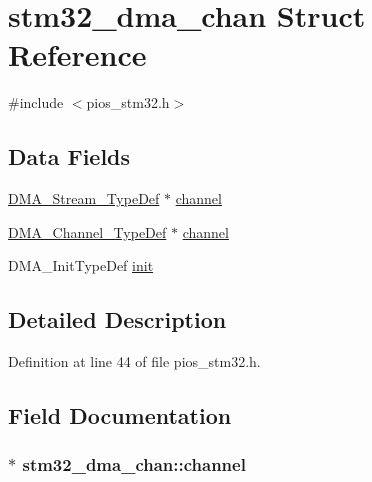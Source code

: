 \hypertarget{structstm32__dma__chan}{\section{stm32\-\_\-dma\-\_\-chan Struct Reference}
\label{structstm32__dma__chan}
}


{\ttfamily \#include $<$pios\-\_\-stm32.\-h$>$}

\subsection*{Data Fields}
\begin{DoxyCompactItemize}
\item 
\hyperlink{struct_d_m_a___stream___type_def}{D\-M\-A\-\_\-\-Stream\-\_\-\-Type\-Def} $\ast$ \hyperlink{structstm32__dma__chan_a17a0b808033d1fd3cdb23c379b2e8318}{channel}
\item 
\hyperlink{struct_d_m_a___channel___type_def}{D\-M\-A\-\_\-\-Channel\-\_\-\-Type\-Def} $\ast$ \hyperlink{structstm32__dma__chan_a83c74feec82b3ebc787cab90df6b2264}{channel}
\item 
D\-M\-A\-\_\-\-Init\-Type\-Def \hyperlink{structstm32__dma__chan_a26b43c1f3ac4595c61a12d5bf54c39fb}{init}
\end{DoxyCompactItemize}


\subsection{Detailed Description}


Definition at line 44 of file pios\-\_\-stm32.\-h.



\subsection{Field Documentation}
\hypertarget{structstm32__dma__chan_a17a0b808033d1fd3cdb23c379b2e8318}{
\subsubsection[{channel}]{$\ast$ stm32\-\_\-dma\-\_\-chan\-::channel}}\label{structstm32__dma__chan_a17a0b808033d1fd3cdb23c379b2e8318}


